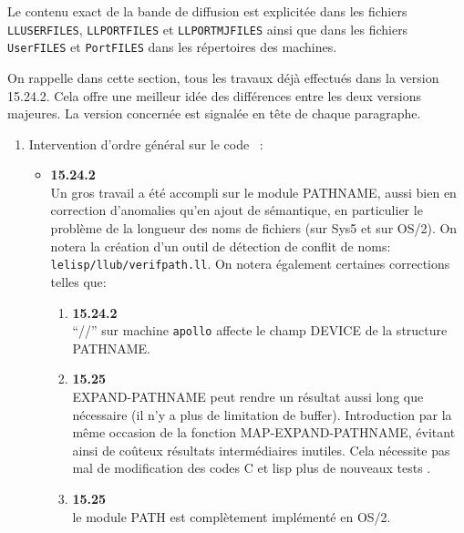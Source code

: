 Le contenu exact de la bande de diffusion est explicit\'{e}e dans les
fichiers {\tt LLUSERFILES}, {\tt LLPORTFILES} et {\tt LLPORTMJFILES}
ainsi que dans les fichiers {\tt UserFILES} et {\tt PortFILES} dans
les r\'{e}pertoires des machines.


On rappelle dans cette section, tous les travaux d\'{e}j\`{a} effectu\'{e}s
dans la version 15.24.2. Cela offre une meilleur id\'{e}e des
diff\'{e}rences entre les deux versions majeures. La version concern\'{e}e est
signal\'{e}e en t\^{e}te de chaque paragraphe.

\begin {enumerate}

\item Intervention d'ordre g\'{e}n\'{e}ral sur le code \LeLisp\ :

\begin {itemize}

\item {\bf 15.24.2} \\
Un gros travail a \'{e}t\'{e} accompli sur le module PATHNAME,
aussi bien en correction d'anomalies qu'en ajout de s\'{e}mantique,
en particulier le probl\`{e}me de la longueur des noms de fichiers (sur
Sys5 et sur OS/2). On notera la cr\'{e}ation d'un outil de
d\'{e}tection de conflit de noms: {\tt lelisp/llub/verifpath.ll}.
On notera \'{e}galement certaines corrections telles que:

\begin {enumerate}

\item {\bf 15.24.2} \\
``//{''} sur machine {\tt apollo} affecte le champ DEVICE de la structure
PATHNAME. 

\item {\bf 15.25} \\
EXPAND-PATHNAME peut rendre  
un r\'{e}sultat aussi long que n\'{e}cessaire (il n'y a plus de
limitation de buffer). Introduction par la m\^{e}me occasion de la
fonction MAP-EXPAND-PATHNAME, \'{e}vitant ainsi de co\^{u}teux r\'{e}sultats
interm\'{e}diaires inutiles. Cela n\'{e}cessite pas mal de modification des
codes C et lisp plus de nouveaux tests .

\item {\bf 15.25} \\
le module PATH est compl\`{e}tement impl\'{e}ment\'{e} en OS/2.


\end{enumerate}
\end{itemize}
\end{enumerate}
